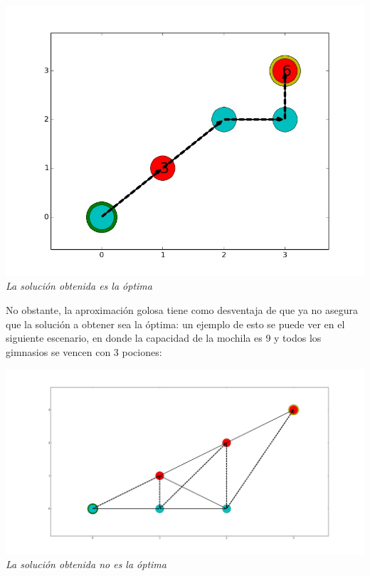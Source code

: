 \vspace*{0.3cm} \vspace*{0.3cm}
  \begin{center}
\includegraphics[scale=0.40]{./EJ2/optima.jpeg}
\\{\textit{La soluci\'on obtenida es la \'optima}}
  \end{center}
  \vspace*{0.3cm}

No obstante, la aproximación golosa tiene como desventaja de que ya no asegura que la solución a obtener sea la óptima: un ejemplo de esto se puede ver en el siguiente escenario, en donde la capacidad de la mochila es 9 y todos los gimnasios se vencen con 3 pociones:

\vspace*{0.3cm} \vspace*{0.3cm}
  \begin{center}
\includegraphics[scale=0.20]{./EJ2/nooptima.jpeg}
\\{\textit{La soluci\'on obtenida no es la \'optima}}
  \end{center}
  \vspace*{0.3cm}